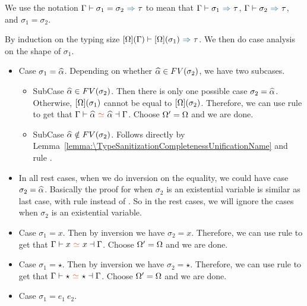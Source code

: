 We use the notation $\tctx \byinf \sigma_1 = \sigma_2 \infto \tau$ to mean that
$\tctx \byinf \sigma_1 \infto \tau$,
$\tctx \byinf \sigma_2 \infto \tau$,
and $\sigma_1 = \sigma_2$.

\begin{lemma}[\UnificationCompletenessName]
  \label{lemma:\UnificationCompletenessName}
    \UnificationCompletenessBody
\end{lemma}
\proof

By induction on the typing size
$\applye \cctx \tctx \byinf \applye \cctx {\sigma_1} \infto \tau$.
We then do case analysis on the shape of $\sigma_1$.

\begin{itemize}
\item Case $\sigma_1 = \widehat{\alpha}$.
  Depending on whether $\widehat{\alpha} \in FV(\sigma_2)$, we have two subcases.
  \begin{itemize}
  \item SubCase $\widehat{\alpha} \in FV(\sigma_2)$.
    Then there is only one possible case $\sigma_2 = \widehat{\alpha}$.
    Otherwise, $[\Omega](\sigma_1)$ cannot be equal to $[\Omega](\sigma_2)$.
    Therefore, we can use rule  to get that
    $\tctx \byuni \genA \uni \genA \toctxo$.
    Choose $\Omega' = \Omega$ and we are done.
  \item SubCase $\widehat{\alpha} \notin FV(\sigma_2)$.
    Follows directly by
    Lemma~\ref{lemma:\TypeSanitizationCompletenessUnificationName}
    and rule .
  \end{itemize}
\item In all rest cases, when we do inversion on the equality, we could have
  case $\sigma_2 = \widehat{\alpha}$. Basically the proof for when $\sigma_2$ is an
  existential variable is similar as last case, with rule  instead
  of . So in the rest cases, we will ignore the cases when
  $\sigma_2$ is an existential variable.
\item Case $\sigma_1 = x$.
  Then by inversion we have $\sigma_2 = x$.
  Therefore, we can use rule  to get that
  $\tctx \byuni x \uni x \toctxo$.
  Choose $\Omega' = \Omega$ and we are done.
\item Case $\sigma_1 = \star$.
  Then by inversion we have $\sigma_2 = \star$.
  Therefore, we can use rule  to get that
  $\tctx \byuni \star \uni \star \toctxo$.
  Choose $\Omega' = \Omega$ and we are done.
\item Case $\sigma_1 = e_1 ~ e_2$.
  \begin{longtable}[l]{lll}

\end{longtable}
\end{itemize}
